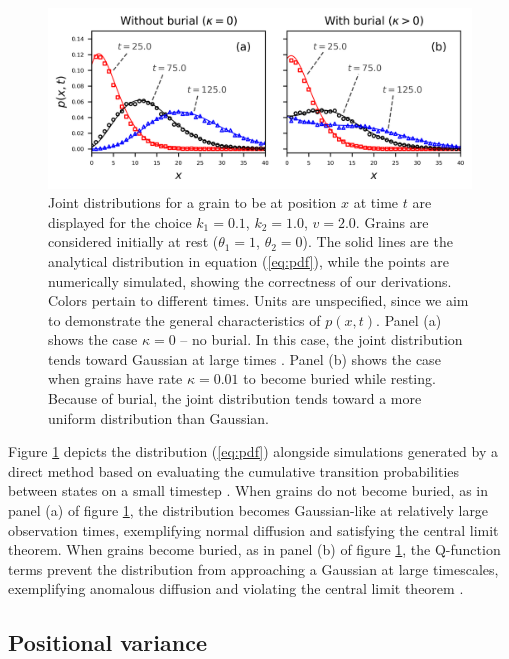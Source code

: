 \begin{figure}[t]
	\includegraphics[width=\linewidth,keepaspectratio]{./figures/ch4/pdf-plot.png}
	\caption{Joint distributions for a grain to be at position $x$ at time $t$ are displayed for the choice $k_1=0.1$, $k_2=1.0$, $v=2.0$. Grains are considered initially at rest ($\theta_1=1$, $\theta_2=0$). The solid lines are the analytical distribution in equation (\ref{eq:pdf}), while the points are numerically simulated, showing the correctness of our derivations. Colors pertain to different times. Units are unspecified, since we aim to demonstrate the general characteristics of $p(x,t)$. Panel (a) shows the case $\kappa=0$ -- no burial. In this case, the joint distribution tends toward Gaussian at large times \citep{Einstein1937,Lisle1998}. Panel (b) shows the case when grains have rate $\kappa = 0.01$ to become buried while resting. Because of burial, the joint distribution tends toward a more uniform distribution than Gaussian.
		\label{fig:pdfs}}
\end{figure}

Figure \ref{fig:pdfs} depicts the distribution (\ref{eq:pdf}) alongside simulations generated by a direct method based on evaluating the cumulative transition probabilities between states on a small timestep \citep{Barik2006}.
When grains do not become buried, as in panel (a) of figure \ref{fig:pdfs}, the distribution becomes Gaussian-like at relatively large observation times, exemplifying normal diffusion and satisfying the central limit theorem.
When grains become buried, as in panel (b) of figure \ref{fig:pdfs},  the Q-function terms prevent the distribution from approaching a Gaussian at large timescales, exemplifying anomalous diffusion \citep{Weeks1998} and violating the central limit theorem \citep{Metzler2000,Schumer2009}.


\subsection{Positional variance}

